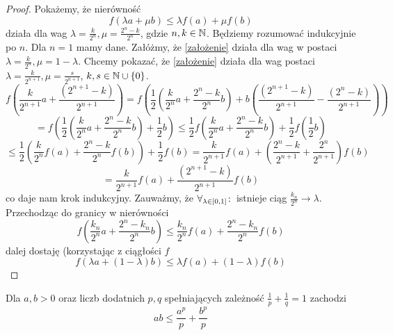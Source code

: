 \documentclass[9pt]{article}
\begin{document}
\begin{proof}
    Pokażemy, że nierówność
    \begin{equation}
        f (\lambda a + \mu b) \le \lambda f(a) + \mu f(b)
        \label {założenie}
    \end{equation}
    działa dla wag $\lambda = \frac{k}{2^n}, \mu = \frac{2^n-k}{2^n}$, gdzie $n, k \in \mathbb{N}$.
    Będziemy rozumować indukcyjnie po $n$. Dla $n = 1$ mamy dane. Załóżmy, że \eqref{założenie}
    działa dla wag w postaci $\lambda = \frac{k}{2^n}, \mu = 1-\lambda$. Chcemy pokazać, że
    \eqref{założenie} działa dla wag postaci $\lambda = \frac{k}{2^{n+1}}, \mu = \frac{s}{2^{n+1}}$,
    $k, s \in \mathbb{N} \cup \{0\}$.
    \[
        f (\frac{k}{2^{n+1}} a + \frac{(2^{n+1}-k)}{2^{n+1}}) =
        f \left(
        \frac{1}{2} \left(\frac{k}{2^n}a + \frac{2^n-k}{2^n} b\right) +
        b \left(\frac{(2^{n+1}-k)}{2^{n+1}} - \frac{(2^{n}-k)}{2^{n+1}}\right)
        \right)
    \]
    \[
        =
        f \left(
        \frac{1}{2} \left(\frac{k}{2^n} a + \frac{2^n-k}{2^n} b\right) + \frac{1}{2} b
        \right)
        \le 
        \frac{1}{2}
        f \left(
        \frac{k}{2^n} a + \frac{2^n-k}{2^n} b
        \right)
        + \frac{1}{2} f \left(
        \frac{1}{2} b
        \right)
    \]
    \[
        \le
        \frac{1}{2}
        \left(
        \frac{k}{2^n}f(a) + \frac{2^n - k}{2^n} f(b)
        \right)
        + \frac{1}{2} f(b)
        =
        \frac{k}{2^{n+1}} f(a) +
        \left(
        \frac{2^n-k}{2^{n+1}} + \frac{2^n}{2^{n+1}}
        \right) f(b)
    \]
    \[
        =
        \frac{k}{2^{n+1}} f(a) + \frac{(2^{n+1}-k)}{2^{n+1}} f(b)
    \]
    co daje nam krok indukcyjny. Zauważmy, że $\forall_{\lambda \in [0,1]} \! : \,$ istnieje ciąg
    $\frac{k_n}{2^n} \to \lambda$. Przechodząc do granicy w nierówności
    \[
        f (\frac{k_n}{2^n} a + \frac{2^n-k_n}{2^n} b) \le
        \frac{k_n}{2^n} f(a) + \frac{2^n - k_n}{2^n} f(b)
    \]
    dalej dostaję (korzystając z ciągłości $f$
    \[
        f (\lambda a + (1-\lambda) b) \le \lambda f(a) + (1-\lambda) f(b)
    \]
\end{proof}

\begin{Twi}
    Dla $a, b > 0$ oraz liczb dodatnich $p, q$ spełniających zależność
    $\frac{1}{p} + \frac{1}{q} = 1$ zachodzi
    \begin{equation}
        ab \le \frac{a^p}{p} + \frac{b^p}{p}
        \label{young}
    \end{equation}
\end{Twi}
\end{document}

